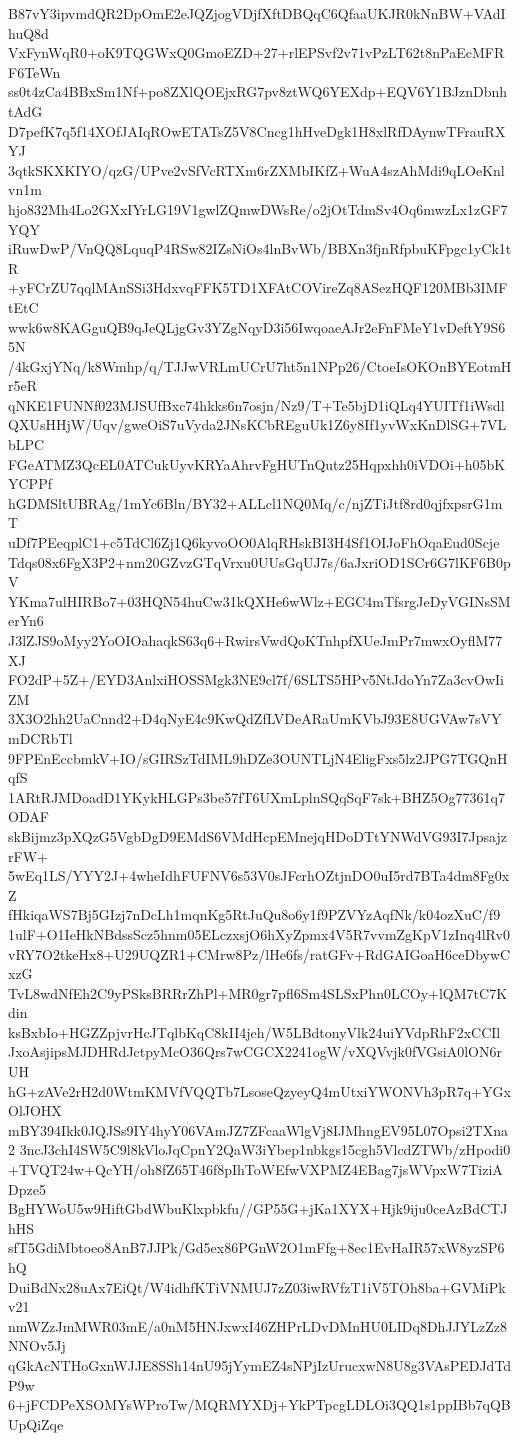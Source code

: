 B87vY3ipvmdQR2DpOmE2eJQZjogVDjfXftDBQqC6QfaaUKJR0kNnBW+VAdIhuQ8d
VxFynWqR0+oK9TQGWxQ0GmoEZD+27+rlEPSvf2v71vPzLT62t8nPaEcMFRF6TeWn
ss0t4zCa4BBxSm1Nf+po8ZXlQOEjxRG7pv8ztWQ6YEXdp+EQV6Y1BJznDbnhtAdG
D7pefK7q5f14XOfJAIqROwETATsZ5V8Cncg1hHveDgk1H8xlRfDAynwTFrauRXYJ
3qtkSKXKIYO/qzG/UPve2vSfVcRTXm6rZXMbIKfZ+WuA4szAhMdi9qLOeKnlvn1m
hjo832Mh4Lo2GXxIYrLG19V1gwlZQmwDWsRe/o2jOtTdmSv4Oq6mwzLx1zGF7YQY
iRuwDwP/VnQQ8LquqP4RSw82IZsNiOs4lnBvWb/BBXn3fjnRfpbuKFpgc1yCk1tR
+yFCrZU7qqlMAnSSi3HdxvqFFK5TD1XFAtCOVireZq8ASezHQF120MBb3IMFtEtC
wwk6w8KAGguQB9qJeQLjgGv3YZgNqyD3i56IwqoaeAJr2eFnFMeY1vDeftY9S65N
/4kGxjYNq/k8Wmhp/q/TJJwVRLmUCrU7ht5n1NPp26/CtoeIsOKOnBYEotmHr5eR
qNKE1FUNNf023MJSUfBxc74hkks6n7osjn/Nz9/T+Te5bjD1iQLq4YUITf1iWsdl
QXUsHHjW/Uqv/gweOiS7uVyda2JNsKCbREguUk1Z6y8If1yvWxKnDlSG+7VLbLPC
FGeATMZ3QcEL0ATCukUyvKRYaAhrvFgHUTnQutz25Hqpxhh0iVDOi+h05bKYCPPf
hGDMSltUBRAg/1mYc6Bln/BY32+ALLcl1NQ0Mq/c/njZTiJtf8rd0qjfxpsrG1mT
uDf7PEeqplC1+c5TdCl6Zj1Q6kyvoOO0AlqRHskBI3H4Sf1OIJoFhOqaEud0Scje
Tdqs08x6FgX3P2+nm20GZvzGTqVrxu0UUsGqUJ7s/6aJxriOD1SCr6G7lKF6B0pV
YKma7ulHIRBo7+03HQN54huCw31kQXHe6wWlz+EGC4mTfsrgJeDyVGINsSMerYn6
J3lZJS9oMyy2YoOIOahaqkS63q6+RwirsVwdQoKTnhpfXUeJmPr7mwxOyflM77XJ
FO2dP+5Z+/EYD3AnlxiHOSSMgk3NE9cl7f/6SLTS5HPv5NtJdoYn7Za3cvOwIiZM
3X3O2hh2UaCnnd2+D4qNyE4c9KwQdZfLVDeARaUmKVbJ93E8UGVAw7sVYmDCRbTl
9FPEnEccbmkV+IO/sGIRSzTdIML9hDZe3OUNTLjN4EligFxs5lz2JPG7TGQnHqfS
1ARtRJMDoadD1YKykHLGPs3be57fT6UXmLplnSQqSqF7sk+BHZ5Og77361q7ODAF
skBijmz3pXQzG5VgbDgD9EMdS6VMdHcpEMnejqHDoDTtYNWdVG93I7JpsajzrFW+
5wEq1LS/YYY2J+4wheIdhFUFNV6s53V0sJFcrhOZtjnDO0uI5rd7BTa4dm8Fg0xZ
fHkiqaWS7Bj5GIzj7nDcLh1mqnKg5RtJuQu8o6y1f9PZVYzAqfNk/k04ozXuC/f9
1ulF+O1IeHkNBdssScz5hnm05ELczxsjO6hXyZpmx4V5R7vvmZgKpV1zInq4lRv0
vRY7O2tkeHx8+U29UQZR1+CMrw8Pz/lHe6fs/ratGFv+RdGAIGoaH6ceDbywCxzG
TvL8wdNfEh2C9yPSksBRRrZhPl+MR0gr7pfl6Sm4SLSxPhn0LCOy+lQM7tC7Kdin
ksBxbIo+HGZZpjvrHcJTqlbKqC8kII4jeh/W5LBdtonyVlk24uiYVdpRhF2xCCIl
JxoAsjipsMJDHRdJctpyMcO36Qrs7wCGCX2241ogW/vXQVvjk0fVGsiA0lON6rUH
hG+zAVe2rH2d0WtmKMVfVQQTb7LsoseQzyeyQ4mUtxiYWONVh3pR7q+YGxOlJOHX
mBY394Ikk0JQJSs9IY4hyY06VAmJZ7ZFcaaWlgVj8IJMhngEV95L07Opsi2TXna2
3ncJ3chI4SW5C9l8kVloJqCpnY2QaW3iYbep1nbkgs15cgh5VlcdZTWb/zHpodi0
+TVQT24w+QcYH/oh8fZ65T46f8pIhToWEfwVXPMZ4EBag7jsWVpxW7TiziADpze5
BgHYWoU5w9HiftGbdWbuKlxpbkfu//GP55G+jKa1XYX+Hjk9iju0ceAzBdCTJhHS
sfT5GdiMbtoeo8AnB7JJPk/Gd5ex86PGnW2O1mFfg+8ec1EvHaIR57xW8yzSP6hQ
DuiBdNx28uAx7EiQt/W4idhfKTiVNMUJ7zZ03iwRVfzT1iV5TOh8ba+GVMiPkv21
nmWZzJmMWR03mE/a0nM5HNJxwxI46ZHPrLDvDMnHU0LIDq8DhJJYLzZz8NNOv5Jj
qGkAcNTHoGxnWJJE8SSh14nU95jYymEZ4sNPjIzUrucxwN8U8g3VAsPEDJdTdP9w
6+jFCDPeXSOMYsWProTw/MQRMYXDj+YkPTpcgLDLOi3QQ1s1ppIBb7qQBUpQiZqe
